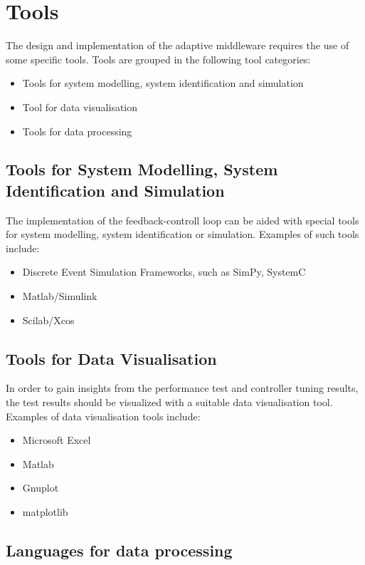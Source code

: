\section{Tools} %
\label{sec:ch6_tools}

The design and implementation of the adaptive middleware requires the use of some specific tools. Tools are grouped in the following tool categories:

\begin{itemize}
	\item Tools for system modelling, system identification and simulation
	\item Tool for data visualisation
	\item Tools for data processing
\end{itemize}

\subsection{Tools for System Modelling, System Identification and Simulation}

The implementation of the feedback-controll loop can be aided with special tools for system modelling, system identification or simulation.
Examples of such tools include:

\begin{itemize}
	\item Discrete Event Simulation Frameworks, such as SimPy, SystemC
	\item Matlab/Simulink
	\item Scilab/Xcos
\end{itemize}

\subsection{Tools for Data Visualisation}

In order to gain insights from the performance test  and controller tuning results, the test results should be visualized with a suitable data visualisation tool. Examples of data visualisation tools include:

\begin{itemize}
	\item Microsoft Excel
	\item Matlab
	\item Gnuplot
	\item matplotlib
\end{itemize}

\subsection{Languages for data processing}

